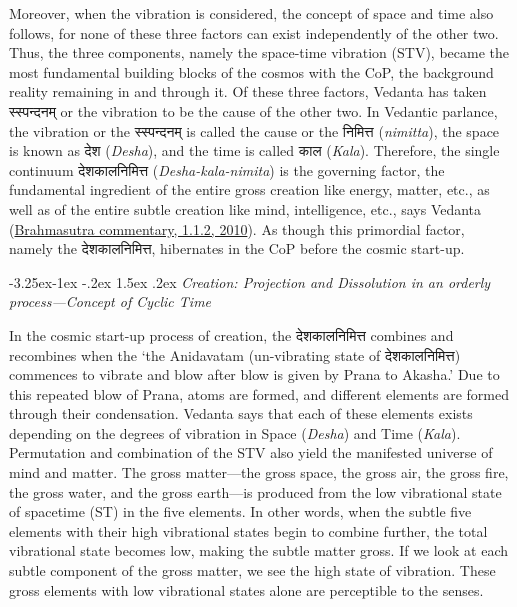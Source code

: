 \documentclass[twoside, 13pt]{article}
\makeatletter
\renewcommand\subsection{\@startsection{subsection}{2}{\z@}%
                                     {-3.25ex\@plus -1ex \@minus -.2ex}%
                                     {1.5ex \@plus .2ex}%
                                     {\normalfont\Large\bfseries}}
\makeatother
\begin{document}
{{Moreover, when the vibration is considered, the concept of space and time also follows, for none of these three factors can exist independently of the other two. Thus, the three components, namely the space-time vibration (STV), became the most fundamental building blocks of the cosmos with the CoP, the background reality remaining in and through it. Of these three factors, Vedanta has taken \foreignlanguage{hindi}{{\fontsize{9}{11}\selectfont स्स्पन्दनम्}} or the vibration to be the cause of the other two. In Vedantic parlance, the vibration or the \foreignlanguage{hindi}{{\fontsize{9}{11}\selectfont स्स्पन्दनम् }}is called the cause or the \foreignlanguage{hindi}{{\fontsize{9}{11}\selectfont निमित्त}} (\textit{nimitta}), the space is known as \foreignlanguage{hindi}{{\fontsize{9}{11}\selectfont देश }}(\textit{Desha}), and the time is called \foreignlanguage{hindi}{{\fontsize{9}{11}\selectfont काल}} (\textit{Kala}). Therefore, the single continuum \foreignlanguage{hindi}{{\fontsize{9}{11}\selectfont देशकालनिमित्त}} (\textit{Desha-kala-nimita}) is the governing factor, the fundamental ingredient of the entire gross creation like energy, matter, etc., as well as of the entire subtle creation like mind, intelligence, etc., says Vedanta (\underline{Brahmasutra commentary, 1.1.2, 2010}). As though this primordial factor, namely the \foreignlanguage{hindi}{{\fontsize{9}{11}\selectfont देशकालनिमित्त,}} hibernates in the CoP before the cosmic start-up.} 

{\fontsize{8}{10}\selectfont\subsection{\textit{Creation: Projection and Dissolution in an orderly\\ process—Concept of Cyclic Time}}}\label{subsec-2.2}


{\fontsize{12}{14}\selectfont In the cosmic start-up process of creation, the \foreignlanguage{hindi}{{\fontsize{9}{11}\selectfont देशकालनिमित्त}} combines and recombines when the ‘the Anidavatam (un-vibrating state of \foreignlanguage{hindi}{{\fontsize{9}{11}\selectfont देशकालनिमित्त}}) commences to vibrate and blow after blow is given by Prana to Akasha.’ Due to this repeated blow of Prana, atoms are formed, and different elements are formed through their condensation. Vedanta says that each of these elements exists depending on the degrees of vibration in Space (\textit{Desha}) and Time (\textit{Kala}). Permutation and combination of the STV also yield the manifested universe of mind and matter. The gross matter—the gross space, the gross air, the gross fire, the gross water, and the gross earth—is produced from the low vibrational state of  spacetime (ST) in the five elements. In other words, when the subtle five elements with their high vibrational states begin to combine further, the total vibrational state becomes low, making the subtle matter gross. If we look at each subtle component of the gross matter, we see the high state of vibration. These gross elements with low vibrational states alone are perceptible to the senses. 


}}
\end{document}
